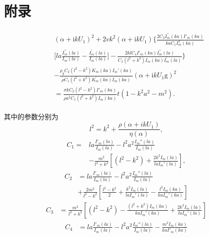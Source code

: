 \documentclass[UTF8]{gapd}
\begin{document}
\section*{附录}

\begin{equation}
	\begin{gathered}
	\begin{split}
	&(\alpha+\mathrm{i} k {U}_{1})^{2}+2 v k^{2}(\alpha+\mathrm{i} k {U}_{1}) \bigg\{\frac{2C_3I_{m}^{\prime \prime}(k a)I'_m(ka)}{kaC_1I_{m}^2(k a)}\\
	&\bigg[l a \frac{I_{m}^{\prime \prime}(l a)}{I_{m}(l a)}-\frac{I_{m}^{\prime}(l a)}{I_{m}(l a)}\bigg]-\frac{2klC_4I'_m(ka)I_{m}^{\prime \prime}(l a)}{C_1(l^2+k^2)I_m(ka)I_{m}^{\prime}(l a)} \bigg\}\\
	&-\frac{\rho_gC_2(l^2-k^2)K_{m}(k a)I_m'(ka)}{\rho C_1(l^2+k^2)K_{m}^{\prime}(k a)I_m(ka)}\left(\alpha+\mathrm{i} k {U}_{1}{\mathrm{g}}\right)^{2}\\
	&=\frac{\sigma kC_2(l^{2}-k^{2})I'_m(ka)}{\rho a^2C_1(l^{2}+k^{2})I_m(ka)}t(1-k^{2} a^{2}-m^{2}).  \label{changgongshi}
\end{split}
\end{gathered}
\end{equation}

其中的参数分别为
\begin{equation*}
	l^2=k^2+\frac{\rho(\alpha+ikU_1)}{\eta(\alpha)},
\end{equation*}
\begin{align*}
	C_1=&la\frac{I'_m(la)}{I_m(la)}-l^2a^2\frac{I_m''(la)}{I_m(la)}\\
	&-\frac{m^2}{l^2+k^2}\left[(l^2-k^2)+\frac{2k^2I_m(la)}{laI_m'(la)}\right],
\end{align*}
\begin{align*}
	C_2&=la\frac{I'_m(la)}{I_m(la)}-l^2a^2\frac{I_m''(la)}{I_m(la)}\\
	&+\frac{2m^2}{l^2-k^2}\left[\frac{l^2-k^2}{2}+\frac{k^2I_m(la)}{laI_m'(la)}-\frac{l^2I_m(ka)}{kaI_m'(ka)}\right]
\end{align*}
\begin{align*}
	C_3&=\frac{m^2}{l^2+k^2}\left[(l^2-k^2)-\frac{(l^2+k^2)I_m(ka)}{kaI_m'(ka)}+\frac{2k^2I_m(la)}{laI_m'(la)}\right]
\end{align*}
\begin{align*}
	C_4&=la\frac{I'_m(la)}{I_m(la)}-l^2a^2\frac{I_m''(la)}{I_m(la)}-\frac{m^2I_m(ka)}{kaI'_m(ka)}
\end{align*}
\end{document}
